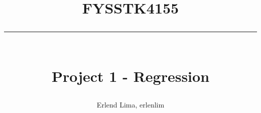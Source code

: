 \newcommand{\horrule}[1]{\rule{\linewidth}{#1}} %

\title{
\large \textsc{FYSSTK4155} \\ [25pt]
\horrule{0.5pt} \\[0.4cm]
\huge Project 1 - Regression}

\author{Erlend Lima, erlenlim}

\maketitle
